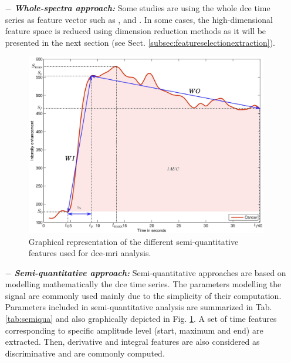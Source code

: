\begin{enumerate}[leftmargin=*]

\item[$-$] \textbf{\textit{Whole-spectra approach:}} Some studies are using the whole \ac{dce} time series as feature vector such as \cite{Ampeliotis2007,Ampeliotis2008}, \cite{Tiwari2012} and \cite{Viswanath2008a,Viswanath2008}. In some cases, the high-dimensional feature space is reduced using dimension reduction methods as it will be presented in the next section (see Sect. \ref{subsec:featureselectionextraction}).

\begin{figure}
	\centering
	\includegraphics[width=\linewidth]{04_data_classification/06_feature_detection/figures/dce/dce_cancer_parameters.eps}
	\caption{Graphical representation of the different semi-quantitative features used for \ac{dce}-\ac{mri} analysis.}
	\label{fig:dceparam}
\end{figure}

\item[$-$] \textbf{\textit{Semi-quantitative approach:}} Semi-quantitative approaches are based on modelling mathematically the \ac{dce} time series. The parameters modelling the signal are commonly used mainly due to the simplicity of their computation. Parameters included in semi-quantitative analysis are summarized in Tab. \ref{tab:semiqua} and also graphically depicted in Fig. \ref{fig:dceparam}. A set of time features corresponding to specific amplitude level (start, maximum and end) are extracted. Then, derivative and integral features are also considered as discriminative and are commonly computed.


\end{enumerate}
